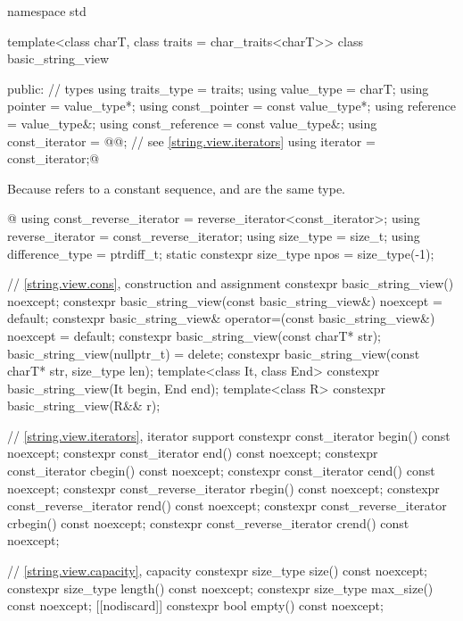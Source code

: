 \begin{codeblock}
namespace std {
  template<class charT, class traits = char_traits<charT>>
  class basic_string_view {
  public:
    // types
    using traits_type            = traits;
    using value_type             = charT;
    using pointer                = value_type*;
    using const_pointer          = const value_type*;
    using reference              = value_type&;
    using const_reference        = const value_type&;
    using const_iterator         = @@; // see \ref{string.view.iterators}
    using iterator               = const_iterator;@
\begin{footnote}
Because  refers to a constant sequence,  and  are the same type.
\end{footnote}@
    using const_reverse_iterator = reverse_iterator<const_iterator>;
    using reverse_iterator       = const_reverse_iterator;
    using size_type              = size_t;
    using difference_type        = ptrdiff_t;
    static constexpr size_type npos = size_type(-1);

    // \ref{string.view.cons}, construction and assignment
    constexpr basic_string_view() noexcept;
    constexpr basic_string_view(const basic_string_view&) noexcept = default;
    constexpr basic_string_view& operator=(const basic_string_view&) noexcept = default;
    constexpr basic_string_view(const charT* str);
    basic_string_view(nullptr_t) = delete;
    constexpr basic_string_view(const charT* str, size_type len);
    template<class It, class End>
      constexpr basic_string_view(It begin, End end);
    template<class R>
      constexpr basic_string_view(R&& r);

    // \ref{string.view.iterators}, iterator support
    constexpr const_iterator begin() const noexcept;
    constexpr const_iterator end() const noexcept;
    constexpr const_iterator cbegin() const noexcept;
    constexpr const_iterator cend() const noexcept;
    constexpr const_reverse_iterator rbegin() const noexcept;
    constexpr const_reverse_iterator rend() const noexcept;
    constexpr const_reverse_iterator crbegin() const noexcept;
    constexpr const_reverse_iterator crend() const noexcept;

    // \ref{string.view.capacity}, capacity
    constexpr size_type size() const noexcept;
    constexpr size_type length() const noexcept;
    constexpr size_type max_size() const noexcept;
    [[nodiscard]] constexpr bool empty() const noexcept;

}}
\end{codeblock}
